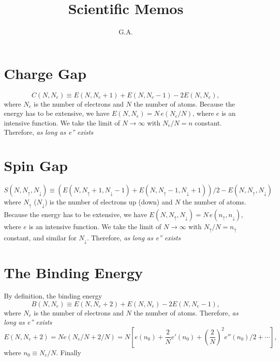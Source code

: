 \documentclass{article}
\begin{document}
\title{Scientific Memos}
\author{G.A.}
\maketitle

\noindent

\section{Charge Gap}
\begin{equation}
C(N, N_e) \equiv E(N, N_e+1) + E(N, N_e-1) - 2 E(N, N_e),
\end{equation}
where $N_e$ is the number of electrons and $N$ the number of atoms.
Because the energy has to be extensive, we have
$E(N, N_e)=N\,e(N_e/N)$, where $e$ is an intensive function.
We take the limit of $N\rightarrow\infty$ with $N_e/N=n$ constant.
Therefore, \emph{as long as e'' exists}  

\section{Spin Gap}
\begin{equation}
S(N, N_\uparrow, N_\downarrow) \equiv (E(N, N_\uparrow+1, N_\downarrow-1) 
+E(N, N_\uparrow-1, N_\downarrow+1))/2 - E(N, N_\uparrow, N_\downarrow)
\end{equation}
where $N_\uparrow$ ($N_\downarrow$) is the number of electrons up (down) and $N$ the number of atoms.
Because the energy has to be extensive, we have
$E(N, N_\uparrow, N_\downarrow)=N\,e(n_\uparrow, n_\downarrow)$, where $e$ is an intensive function.
We take the limit of $N\rightarrow\infty$ with $N_\uparrow/N=n_\uparrow$ constant, and similar for $N_\downarrow$.
Therefore, \emph{as long as e'' exists}  


\section{The Binding Energy}
By definition, the binding energy
\begin{equation}
B(N, N_e) \equiv E(N, N_e+2) + E(N, N_e) - 2 E(N, N_e-1),
\end{equation}
where $N_e$ is the number of electrons and $N$ the number of atoms.
Therefore, \emph{as long as e'' exists}
\begin{equation}
E(N, N_e+2) = Ne(N_e/N + 2/N)=N\left[e(n_0)+\frac{2}{N}e'(n_0) + \left(\frac{2}{N}\right)^2e''(n_0)/2+\cdots\right],
\end{equation}
where $n_0\equiv N_e/N$. Finally 
\end{document}

